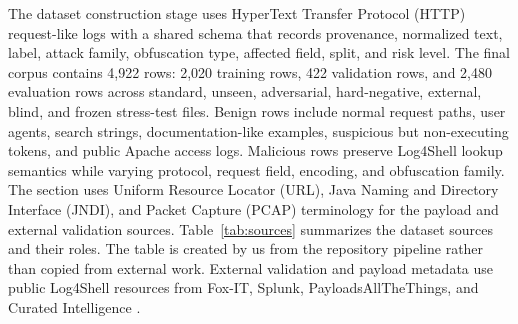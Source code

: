 \documentclass[conference]{IEEEtran}
\begin{document}
The dataset construction stage uses HyperText Transfer Protocol (HTTP)
request-like logs with a shared schema that records provenance, normalized
text, label, attack family, obfuscation type, affected field, split, and risk
level. The final corpus contains 4,922 rows: 2,020 training rows, 422
validation rows, and 2,480 evaluation rows across standard, unseen,
adversarial, hard-negative, external, blind, and frozen stress-test files.
Benign rows include normal request paths, user agents, search strings,
documentation-like examples, suspicious but non-executing tokens, and public
Apache access logs. Malicious rows preserve Log4Shell lookup semantics while
varying protocol, request field, encoding, and obfuscation family. The section
uses Uniform Resource Locator (URL), Java Naming and Directory Interface
(JNDI), and Packet Capture (PCAP) terminology for the payload and external
validation sources. Table~\ref{tab:sources} summarizes the dataset sources and
their roles. The table is created by us from the repository pipeline rather
than copied from external work.
External validation and payload metadata use public Log4Shell resources from
Fox-IT, Splunk, PayloadsAllTheThings, and Curated Intelligence
\cite{foxit_pcaps,splunk_attack_data,payloadsallthethings,curatedintel}.

\begin{table}[!t]
\caption{Dataset sources and their evaluation roles.}
\label{tab:sources}
\centering
{}
\end{table}
\end{document}
